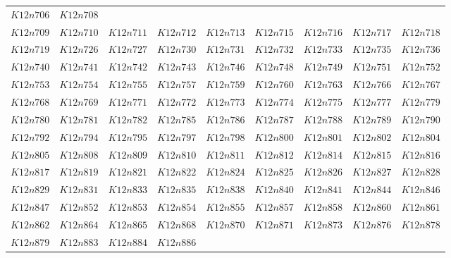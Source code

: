 \documentclass{amsart} %
\theoremstyle{thm}
\theoremstyle{definition}
\numberwithin{equation}{section}
\begin{document}
{\begin{longtable}{@{}lllllllll@{}}
  $K12n706$ &  
  $K12n708$ \\  
  $K12n709$ &  
  $K12n710$ &  
  $K12n711$ &  
  $K12n712$ &  
  $K12n713$ &  
  $K12n715$ &  
  $K12n716$ &  
  $K12n717$ &  
  $K12n718$ \\   
  $K12n719$ &  
  $K12n726$ &  
  $K12n727$ &  
  $K12n730$ &  
  $K12n731$ &  
  $K12n732$ &  
  $K12n733$ &  
  $K12n735$ &  
  $K12n736$ \\   
  $K12n740$ &  
  $K12n741$ &  
  $K12n742$ &  
  $K12n743$ &  
  $K12n746$ &  
  $K12n748$ &  
  $K12n749$ &  
  $K12n751$ &  
  $K12n752$ \\   
  $K12n753$ &  
  $K12n754$ &  
  $K12n755$ &  
  $K12n757$ &  
  $K12n759$ &  
  $K12n760$ &  
  $K12n763$ &  
  $K12n766$ &  
  $K12n767$ \\   
  $K12n768$ &  
  $K12n769$ &  
  $K12n771$ &  
  $K12n772$ &  
  $K12n773$ &  
  $K12n774$ &  
  $K12n775$ &  
  $K12n777$ &  
  $K12n779$ \\   
  $K12n780$ &  
  $K12n781$ &  
  $K12n782$ &  
  $K12n785$ &  
  $K12n786$ &  
  $K12n787$ &  
  $K12n788$ &  
  $K12n789$ &  
  $K12n790$ \\   
  $K12n792$ &  
  $K12n794$ &  
  $K12n795$ &  
  $K12n797$ &  
  $K12n798$ &  
  $K12n800$ &  
  $K12n801$ &  
  $K12n802$ &  
  $K12n804$ \\   
  $K12n805$ &  
  $K12n808$ &  
  $K12n809$ &  
  $K12n810$ &  
  $K12n811$ &  
  $K12n812$ &  
  $K12n814$ &  
  $K12n815$ &  
  $K12n816$ \\   
  $K12n817$ &  
  $K12n819$ &  
  $K12n821$ &  
  $K12n822$ &  
  $K12n824$ &  
  $K12n825$ &  
  $K12n826$ &  
  $K12n827$ &  
  $K12n828$ \\   
  $K12n829$ &  
  $K12n831$ &  
  $K12n833$ &  
  $K12n835$ &  
  $K12n838$ &  
  $K12n840$ &  
  $K12n841$ &  
  $K12n844$ &  
  $K12n846$ \\   
  $K12n847$ &  
  $K12n852$ &  
  $K12n853$ &  
  $K12n854$ &  
  $K12n855$ &  
  $K12n857$ &  
  $K12n858$ &  
  $K12n860$ &  
  $K12n861$ \\   
  $K12n862$ &  
  $K12n864$ &  
  $K12n865$ &  
  $K12n868$ &  
  $K12n870$ &  
  $K12n871$ &  
  $K12n873$ &  
  $K12n876$ &  
  $K12n878$ \\   
  $K12n879$ &  
  $K12n883$ &  
  $K12n884$ &  
  $K12n886$ &&&&&\\ 
\end{longtable}}
\end{document}
